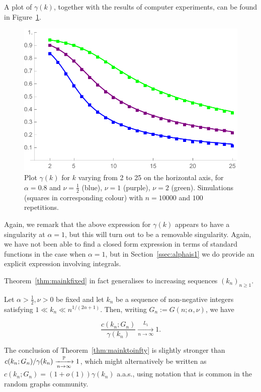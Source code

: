 \noindent
A plot of $\gamma(k)$,  together with the results of computer experiments, can be found in Figure~\ref{fig:gammak}. %
%
%
\begin{figure}[ht]
    \centering
    \includegraphics[scale=0.6]{figures/ckn10000a08nu0512rep100k2to25Squares.pdf}
    \caption{Plot $\gamma(k)$ for $k$ varying from 2 to 25 on the horizontal axis, for $\alpha=0.8$ and $\nu=\frac{1}{2}$ 
    (blue), $\nu=1$ (purple), $\nu=2$ (green). Simulations (squares in corresponding colour) with $n=10000$ and $100$ repetitions.\label{fig:gammak}}
\end{figure}%
%
Again, we remark that the above expression for $\gamma(k)$ appears to have a singularity at $\alpha=1$, but this will turn out to be a removable singularity. 
Again, we have not been able to find a closed form expression in terms of standard functions in the case when $\alpha=1$, but in 
Section~\ref{ssec:alphais1} we do provide an explicit expression involving integrals.

Theorem~\ref{thm:mainkfixed} in fact generalises to increasing sequences $(k_n)_{n \ge 1}$.

\begin{theorem}\label{thm:mainktoinfty}
Let $\alpha>\frac12, \nu>0$ be fixed and let $k_n$ be a sequence of non-negative integers
satisfying $1 \ll k_n \ll n^{1/(2\alpha+1)}$. Then, writing $G_n := G(n;\alpha,\nu)$, we have

$$ \frac{c(k_n;G_n)}{\gamma(k_n)} \xrightarrow[n\to\infty]{L_1} 1. $$ 

\end{theorem}

\noindent
The conclusion of Theorem~\ref{thm:mainktoinfty} is slightly stronger than $c(k_n; G_n)/\gamma(k_n) 
\xrightarrow[n\to\infty]{\mathbb{P}} 1$, which might alternatively be written as $c(k_n;G_n) = (1+o(1)) \gamma(k_n)$ a.a.s., using notation that is common in the random graphs community.


